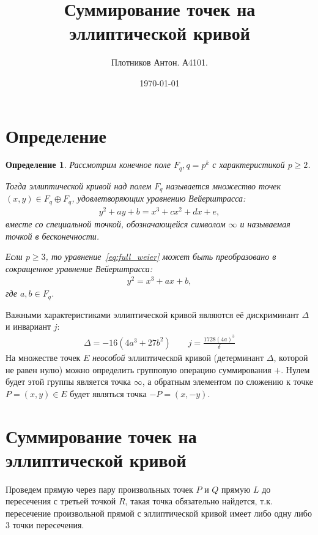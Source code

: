 \documentclass[a4paper, 14pt]{extreport}
\title{Суммирование точек на эллиптической кривой}
\date{\today}
\author{Плотников Антон. А4101.}
\newtheorem{definition}{Определение}
\begin{document}
\maketitle

\section*{Определение}
\begin{definition}
    Рассмотрим конечное поле $F_q, q = p^k$ с характеристикой $p \geq 2$.

    Тогда эллиптической кривой над полем $F_q$ называется множество точек
    $(x, y) \in F_q \oplus F_q$, удовлетворяющих уравнению Вейерштрасса:
    \begin{gather}\label{eq:full_weier}
        y^2 + ay + b = x^3 + cx^2 + dx + e,
    \end{gather}
    вместе со специальной точкой, обозначающейся символом $\infty$ и называемая
    точкой в бесконечности.

    Если $p \geq 3$, то уравнение~\ref{eq:full_weier} может быть преобразовано
    в сокращенное уравнение Вейерштрасса:
    \begin{gather}\label{eq:short_weier}
        y^2=x^3+ax+b,
    \end{gather}
    где $a, b \in F_q$.
\end{definition}

Важными характеристиками эллиптической кривой являются её дискриминант $\Delta$
и инвариант $j$:
\begin{gather}
    \Delta = -16(4a^3 + 27b^2) \qquad j = \frac{1728{(4a)}^3}{\delta}
\end{gather}
На множестве точек $E$ \emph{неособой} эллиптической кривой (детерминант
$\Delta$, которой не равен нулю) можно определить групповую операцию
суммирования $+$. Нулем будет этой группы является точка $\infty$, а обратным
элементом по сложению к точке $P = (x, y) \in E$ будет являться точка $-P = (x,
-y)$.

\section*{Суммирование точек на эллиптической кривой}

Проведем прямую через пару произвольных точек $P$ и $Q$ прямую $L$ до
пересечения с третьей точкой $R$, такая точка обязательно найдется, т.к.
пересечение произвольной прямой с эллиптической кривой имеет либо одну либо 3
точки пересечения.
\end{document}
